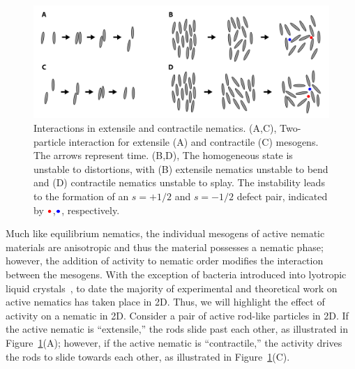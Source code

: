 \begin{figure}
  \centering
  \includegraphics{figures/C3/Ch3-Figs_ActiveInteraction.png}
  \caption{Interactions in extensile and contractile nematics.
  (A,C), Two-particle interaction for extensile (A) and contractile (C) mesogens.
  The arrows represent time.
  (B,D), The homogeneous state is unstable to distortions, with (B) extensile nematics unstable to bend and (D) contractile nematics unstable to splay.
  The instability leads to the formation of an $s = + 1/2$ and $s = -1/2$ defect pair, indicated by ${\color{red} \bullet}$,${\color{blue} \bullet}$, respectively.}\label{f:3-ActiveInteraction}
\end{figure}

Much like equilibrium nematics, the individual mesogens of active nematic materials are anisotropic and thus the material possesses a nematic phase; however, the addition of activity to nematic order modifies the interaction between the mesogens.
With the exception of bacteria introduced into lyotropic liquid crystals~\cite{RN86}, to date the majority of experimental and theoretical work on active nematics has taken place in 2D.
Thus, we will highlight the effect of activity on a nematic in 2D.
Consider a pair of active rod-like particles in 2D.
If the active nematic is ``extensile,'' the rods slide past each other, as illustrated in Figure~\ref{f:3-ActiveInteraction}(A); however, if the active nematic is ``contractile,'' the activity drives the rods to slide towards each other, as illustrated in Figure~\ref{f:3-ActiveInteraction}(C).

